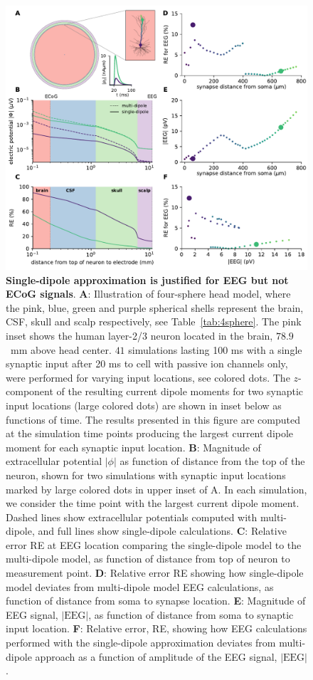 \documentclass[preprint,10pt,authoryear]{elsarticle}
\begin{document}
\begin{figure}[H]
	\centering
	\includegraphics[width=1.0\textwidth]{figure2_eeg}
	\caption{\textbf{Single-dipole approximation is justified for EEG but not ECoG signals}. 
		\textbf{A}: Illustration of four-sphere head model, where the pink, blue, green and purple spherical shells represent the brain, CSF, skull and scalp respectively, see Table~\ref{tab:4sphere}. The pink inset shows the human layer-2/3 neuron \citep{EYAL2016} located in the brain, $78.9$~\si{mm} above head center. $41$ simulations lasting 100 ms with a single synaptic input after 20 ms to cell with passive ion channels only, were performed for varying input locations, see colored dots. 
		The $z$-component of the resulting current dipole moments for two synaptic input locations (large colored dots) are shown in inset below as functions of time. The results presented in this figure are computed at the simulation time points producing the largest current dipole moment for each synaptic input location.
		\textbf{B}: Magnitude of extracellular potential $|\phi|$ as function of distance from the top of the neuron, shown for two simulations with synaptic input locations marked by large colored dots in upper inset of A. In each simulation, we consider the time point with the largest current dipole moment. Dashed lines show extracellular potentials computed with multi-dipole, and full lines show single-dipole calculations.
		\textbf{C}: Relative error RE at EEG location comparing the single-dipole model to the multi-dipole model, as function of distance from top of neuron to measurement point.
		\textbf{D}: Relative error RE showing how single-dipole model deviates from multi-dipole model EEG calculations, as function of distance from soma to synapse location.
		\textbf{E}: Magnitude of EEG signal, $|\text{EEG}|$, as function of distance from soma to synaptic input location.
		\textbf{F}: Relative error, RE, showing how EEG calculations performed with the single-dipole approximation deviates from multi-dipole approach as a function of amplitude of the EEG signal, $|\text{EEG}|$.}
	\label{fig:compare_multi_single_dipole}
\end{figure}
\end{document}
